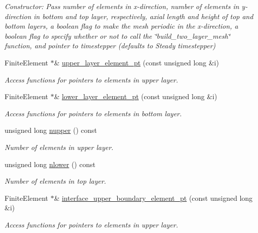 \begin{DoxyCompactItemize}
\begin{DoxyCompactList}\small\item\em Constructor\+: Pass number of elements in x-\/direction, number of elements in y-\/direction in bottom and top layer, respectively, axial length and height of top and bottom layers, a boolean flag to make the mesh periodic in the x-\/direction, a boolean flag to specify whether or not to call the \char`\"{}build\+\_\+two\+\_\+layer\+\_\+mesh\char`\"{} function, and pointer to timestepper (defaults to Steady timestepper) \end{DoxyCompactList}\item 
Finite\+Element $\ast$\& \hyperlink{classoomph_1_1TwoLayerSpineMesh_a36680574d0c8f023206ce8ffe1a99b06}{upper\+\_\+layer\+\_\+element\+\_\+pt} (const unsigned long \&i)
\begin{DoxyCompactList}\small\item\em Access functions for pointers to elements in upper layer. \end{DoxyCompactList}\item 
Finite\+Element $\ast$\& \hyperlink{classoomph_1_1TwoLayerSpineMesh_a37e08f5f396767bdad632d9b8022655a}{lower\+\_\+layer\+\_\+element\+\_\+pt} (const unsigned long \&i)
\begin{DoxyCompactList}\small\item\em Access functions for pointers to elements in bottom layer. \end{DoxyCompactList}\item 
unsigned long \hyperlink{classoomph_1_1TwoLayerSpineMesh_a7d92e162c4fd6e70627982f761d1a66c}{nupper} () const
\begin{DoxyCompactList}\small\item\em Number of elements in upper layer. \end{DoxyCompactList}\item 
unsigned long \hyperlink{classoomph_1_1TwoLayerSpineMesh_acc617bc2ae9ee4c5084c8fb004a0b1a4}{nlower} () const
\begin{DoxyCompactList}\small\item\em Number of elements in top layer. \end{DoxyCompactList}\item 
Finite\+Element $\ast$\& \hyperlink{classoomph_1_1TwoLayerSpineMesh_a35411cf1e85ed2681e8b91f42a205150}{interface\+\_\+upper\+\_\+boundary\+\_\+element\+\_\+pt} (const unsigned long \&i)
\begin{DoxyCompactList}\small\item\em Access functions for pointers to elements in upper layer. \end{DoxyCompactList}\item 

\end{DoxyCompactItemize}
